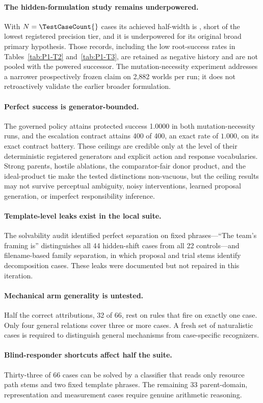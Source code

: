 \paragraph{The hidden-formulation study remains underpowered.}
With $N=\TestCaseCount{}$ cases its achieved half-width is
\AchievedHalfWidth{}, short of the lowest registered precision tier, and it is
underpowered for its original broad primary hypothesis. Those
records, including the low root-success rates in Tables~\ref{tab:P1-T2}
and~\ref{tab:P1-T3}, are retained as negative history and are not pooled with
the powered successor. The mutation-necessity experiment addresses a narrower
prospectively frozen claim on 2,882 worlds per run; it does not retroactively
validate the earlier broader formulation.

\paragraph{Perfect success is generator-bounded.}
The governed policy attains protected success 1.0000 in both mutation-necessity
runs, and the escalation contract attains 400 of 400, an exact rate of $1.000$, on
its exact contract battery. These ceilings are credible only at the level of their deterministic
registered generators and explicit action and response vocabularies. Strong
parents, hostile ablations, the comparator-fair donor product, and the
ideal-product tie make the tested distinctions non-vacuous, but the ceiling
results may not survive perceptual ambiguity, noisy interventions, learned
proposal generation, or imperfect responsibility inference.

\paragraph{Template-level leaks exist in the local suite.}
The solvability audit identified perfect separation on fixed phrases---``The
team's framing is'' distinguishes all 44 hidden-shift cases from all 22
controls---and filename-based family separation, in which proposal and trial
stems identify decomposition cases. These leaks were documented but not repaired
in this iteration.

\paragraph{Mechanical arm generality is untested.}
Half the correct attributions, 32 of 66, rest on rules that fire on exactly one
case. Only four general relations cover three or more cases. A fresh set of
naturalistic cases is required to distinguish general mechanisms from
case-specific recognizers.

\paragraph{Blind-responder shortcuts affect half the suite.}
Thirty-three of 66 cases can be solved by a classifier that reads only resource
path stems and two fixed template phrases. The remaining 33 parent-domain,
representation and measurement cases require genuine arithmetic reasoning.
